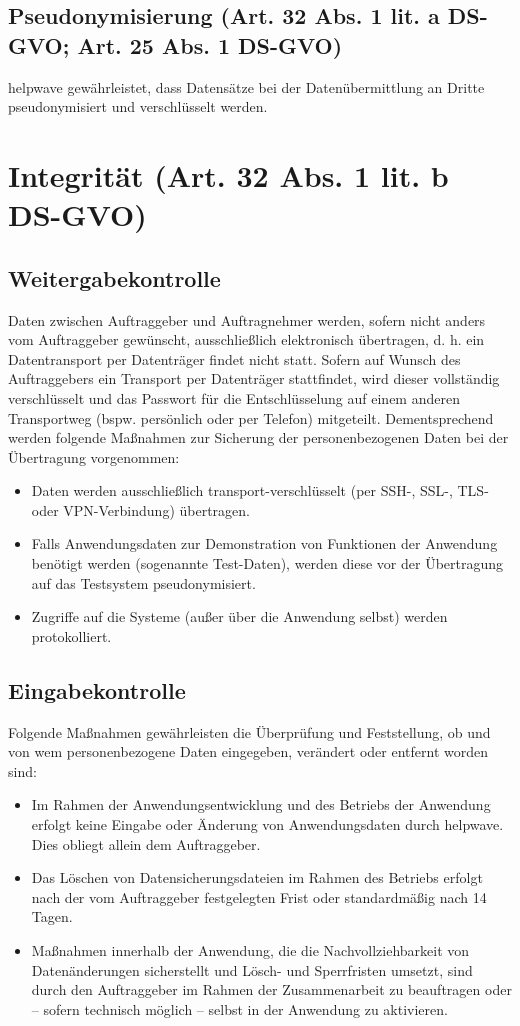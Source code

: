 \documentclass[10pt]{article}
\begin{document}
\subsection{Pseudonymisierung (Art. 32 Abs. 1 lit. a DS-GVO; Art. 25 Abs. 1 DS-GVO)}
helpwave gewährleistet, dass Datensätze bei der Datenübermittlung an Dritte
pseudonymisiert und verschlüsselt werden.
\section{Integrität (Art. 32 Abs. 1 lit. b DS-GVO)}
\subsection{Weitergabekontrolle}
Daten zwischen Auftraggeber und Auftragnehmer werden, sofern nicht anders vom
Auftraggeber gewünscht, ausschließlich elektronisch übertragen, d. h. ein Datentransport
per Datenträger findet nicht statt. Sofern auf Wunsch des Auftraggebers ein Transport per
Datenträger stattfindet, wird dieser vollständig verschlüsselt und das Passwort für die
Entschlüsselung auf einem anderen Transportweg (bspw. persönlich oder per Telefon)
mitgeteilt.
Dementsprechend werden folgende Maßnahmen zur Sicherung der personenbezogenen
Daten bei der Übertragung vorgenommen:
\begin{itemize}
	\item Daten werden ausschließlich transport-verschlüsselt (per SSH-, SSL-, TLS- oder VPN-Verbindung) übertragen.
	\item Falls Anwendungsdaten zur Demonstration von Funktionen der Anwendung benötigt werden (sogenannte Test-Daten), werden diese vor der Übertragung auf das Testsystem pseudonymisiert.
	\item Zugriffe auf die Systeme (außer über die Anwendung selbst) werden protokolliert.
\end{itemize}

\subsection{Eingabekontrolle}
Folgende Maßnahmen gewährleisten die Überprüfung und Feststellung, ob und von wem personenbezogene Daten eingegeben, verändert oder entfernt worden sind:
\begin{itemize}
	\item Im Rahmen der Anwendungsentwicklung und des Betriebs der Anwendung erfolgt keine Eingabe oder Änderung von Anwendungsdaten durch helpwave. Dies obliegt allein dem Auftraggeber.
	\item Das Löschen von Datensicherungsdateien im Rahmen des Betriebs erfolgt nach der vom Auftraggeber festgelegten Frist oder standardmäßig nach 14 Tagen.
	\item Maßnahmen innerhalb der Anwendung, die die Nachvollziehbarkeit von Datenänderungen sicherstellt und Lösch- und Sperrfristen umsetzt, sind durch den Auftraggeber im Rahmen der Zusammenarbeit zu beauftragen oder – sofern technisch möglich – selbst in der Anwendung zu aktivieren.
\end{itemize}
\end{document}
